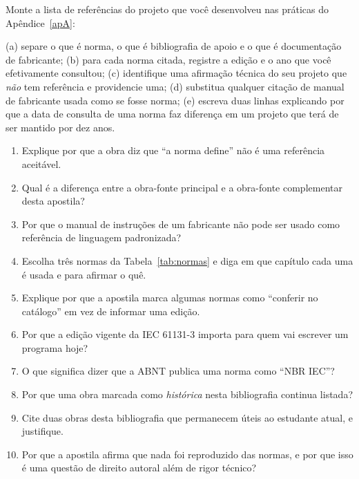\begin{pratica}
Monte a lista de referências do projeto que você desenvolveu nas práticas do Apêndice~\ref{apA}:

(a) separe o que é norma, o que é bibliografia de apoio e o que é documentação de fabricante;
(b) para cada norma citada, registre a edição e o ano que você efetivamente consultou;
(c) identifique uma afirmação técnica do seu projeto que \emph{não} tem referência e providencie uma;
(d) substitua qualquer citação de manual de fabricante usada como se fosse norma;
(e) escreva duas linhas explicando por que a data de consulta de uma norma faz diferença em um
projeto que terá de ser mantido por dez anos.
\end{pratica}

\begin{exercicios}
\begin{enumerate}[label=\alph*)]
  \item Explique por que a obra diz que ``a norma define'' não é uma referência aceitável.
  \item Qual é a diferença entre a obra-fonte principal e a obra-fonte complementar desta apostila?
  \item Por que o manual de instruções de um fabricante não pode ser usado como referência de linguagem
        padronizada?
  \item Escolha três normas da Tabela~\ref{tab:normas} e diga em que capítulo cada uma é usada e para
        afirmar o quê.
  \item Explique por que a apostila marca algumas normas como ``conferir no catálogo'' em vez de
        informar uma edição.
  \item Por que a edição vigente da IEC 61131-3 importa para quem vai escrever um programa hoje?
  \item O que significa dizer que a ABNT publica uma norma como ``NBR IEC''?
  \item Por que uma obra marcada como \emph{histórica} nesta bibliografia continua listada?
  \item Cite duas obras desta bibliografia que permanecem úteis ao estudante atual, e justifique.
  \item Por que a apostila afirma que nada foi reproduzido das normas, e por que isso é uma questão de
        direito autoral além de rigor técnico?
\end{enumerate}
\end{exercicios}
